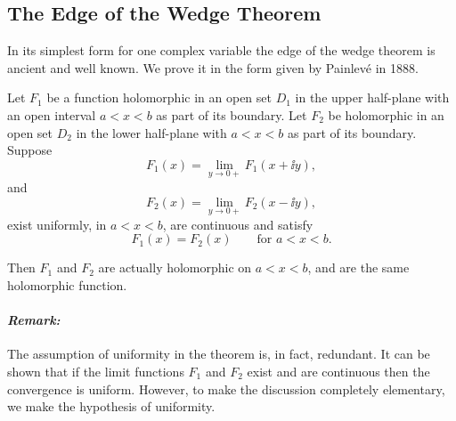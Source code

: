 \subsection{The Edge of the Wedge Theorem}\label{sec:2.5}

In its simplest form for one complex variable the edge of the wedge theorem
is ancient and well known. We prove it in the form given by Painlev\'e in
1888.

\begin{theorem}\label{thm:edge-of-wedge-one-variable}
Let $F_1$ be a function holomorphic in an open set $D_1$ in the upper
half-plane with an open interval $a<x<b$ as part of its boundary. Let $F_2$
be holomorphic in an open set $D_2$ in the lower half-plane with
$a<x<b$ as part of its boundary. Suppose
\begin{equation}
  F_1(x)=\lim_{y\to0+}F_1(x+\ii y),
  \tag{2-94}\label{eq:ch2-edge-one-upper-limit}
\end{equation}
and
\begin{equation}
  F_2(x)=\lim_{y\to0+}F_2(x-\ii y),
  \tag{2-95}\label{eq:ch2-edge-one-lower-limit}
\end{equation}
exist uniformly, in $a<x<b$, are continuous and satisfy
\[
  F_1(x)=F_2(x)\qquad\text{for }a<x<b.
\]

Then $F_1$ and $F_2$ are actually holomorphic on $a<x<b$, and are the same
holomorphic function.
\end{theorem}

\paragraph{\emph{Remark:}}
The assumption of uniformity in the theorem is, in fact, redundant. It can
be shown that if the limit functions $F_1$ and $F_2$ exist and are continuous
then the convergence is uniform. However, to make the discussion completely
elementary, we make the hypothesis of uniformity.




